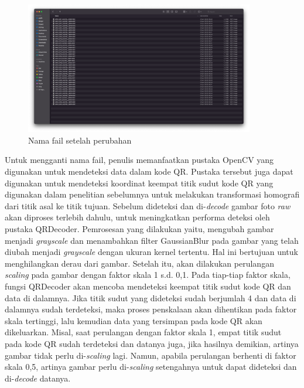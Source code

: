 \begin{figure}[h]
	\centering
	\includegraphics[width=10cm]{contents/chapter-3/3-namafile2.png}
	\caption{Nama fail setelah perubahan}
	\label{Fig: 3-namafile2}
\end{figure}

Untuk mengganti nama fail, penulis memanfaatkan pustaka OpenCV yang digunakan untuk mendeteksi data dalam kode QR. Pustaka tersebut juga dapat digunakan untuk
mendeteksi koordinat keempat titik sudut kode QR yang digunakan dalam penelitian sebelumnya untuk melakukan transformasi homografi dari titik asal ke titik
tujuan. Sebelum dideteksi dan di-\emph{decode} gambar foto \emph{raw} akan diproses terlebih dahulu, untuk meningkatkan performa deteksi oleh pustaka
QRDecoder. Pemrosesan yang dilakukan yaitu, mengubah gambar menjadi \emph{grayscale} dan menambahkan filter GaussianBlur pada gambar yang telah diubah menjadi
\emph{grayscale} dengan ukuran kernel tertentu. Hal ini bertujuan untuk menghilangkan derau dari gambar. Setelah itu, akan dilakukan perulangan \emph{scaling}
pada gambar dengan faktor skala 1 s.d. 0,1. Pada tiap-tiap faktor skala, fungsi QRDecoder akan mencoba mendeteksi keempat titik sudut kode QR dan data di
dalamnya. Jika titik sudut yang dideteksi sudah berjumlah 4 dan data di dalamnya sudah terdeteksi, maka proses penskalaan akan dihentikan pada faktor skala
tertinggi, lalu kemudian data yang tersimpan pada kode QR akan dikeluarkan. Misal, saat perulangan dengan faktor skala 1, empat titik sudut pada kode QR sudah
terdeteksi dan datanya juga, jika hasilnya demikian, artinya gambar tidak perlu di-\emph{scaling} lagi. Namun, apabila perulangan berhenti di faktor skala 0,5,
artinya gambar perlu di-\emph{scaling} setengahnya untuk dapat dideteksi dan di-\emph{decode} datanya.

